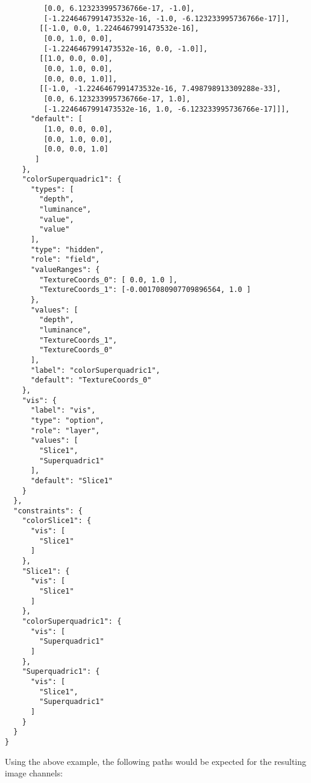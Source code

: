 \begin{verbatim}
         [0.0, 6.123233995736766e-17, -1.0],
         [-1.2246467991473532e-16, -1.0, -6.123233995736766e-17]],
        [[-1.0, 0.0, 1.2246467991473532e-16],
         [0.0, 1.0, 0.0],
         [-1.2246467991473532e-16, 0.0, -1.0]],
        [[1.0, 0.0, 0.0],
         [0.0, 1.0, 0.0],
         [0.0, 0.0, 1.0]],
        [[-1.0, -1.2246467991473532e-16, 7.498798913309288e-33],
         [0.0, 6.123233995736766e-17, 1.0],
         [-1.2246467991473532e-16, 1.0, -6.123233995736766e-17]]],
      "default": [
         [1.0, 0.0, 0.0],
         [0.0, 1.0, 0.0],
         [0.0, 0.0, 1.0]
       ]
    },
    "colorSuperquadric1": {
      "types": [
        "depth",
        "luminance",
        "value",
        "value"
      ],
      "type": "hidden",
      "role": "field",
      "valueRanges": {
        "TextureCoords_0": [ 0.0, 1.0 ],
        "TextureCoords_1": [-0.0017080907709896564, 1.0 ]
      },
      "values": [
        "depth",
        "luminance",
        "TextureCoords_1",
        "TextureCoords_0"
      ],
      "label": "colorSuperquadric1",
      "default": "TextureCoords_0"
    },
    "vis": {
      "label": "vis",
      "type": "option",
      "role": "layer",
      "values": [
        "Slice1",
        "Superquadric1"
      ],
      "default": "Slice1"
    }
  },
  "constraints": {
    "colorSlice1": {
      "vis": [
        "Slice1"
      ]
    },
    "Slice1": {
      "vis": [
        "Slice1"
      ]
    },
    "colorSuperquadric1": {
      "vis": [
        "Superquadric1"
      ]
    },
    "Superquadric1": {
      "vis": [
        "Slice1",
        "Superquadric1"
      ]
    }
  }
}
\end{verbatim}


Using the above example, the following paths would be expected for the resulting image channels:

